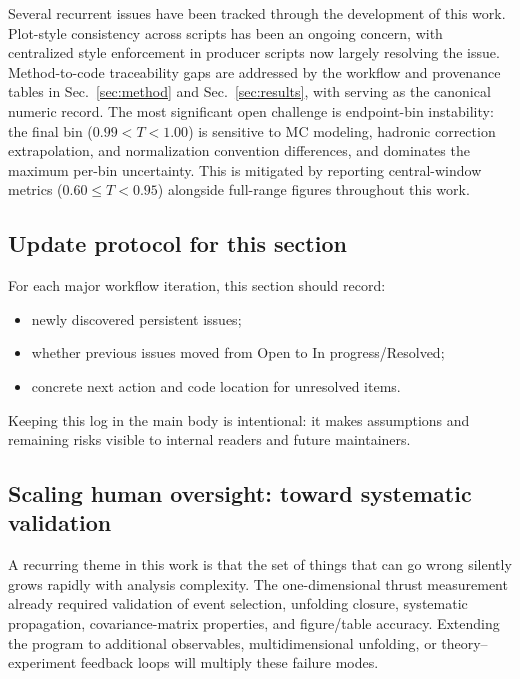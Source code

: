 Several recurrent issues have been tracked through the development of this work. Plot-style consistency across scripts has been an ongoing concern, with centralized style enforcement in producer scripts now largely resolving the issue. Method-to-code traceability gaps are addressed by the workflow and provenance tables in Sec.~\ref{sec:method} and Sec.~\ref{sec:results}, with  serving as the canonical numeric record. The most significant open challenge is endpoint-bin instability: the final bin ($0.99<T<1.00$) is sensitive to MC modeling, hadronic correction extrapolation, and normalization convention differences, and dominates the maximum per-bin uncertainty. This is mitigated by reporting central-window metrics ($0.60\le T<0.95$) alongside full-range figures throughout this work.

\subsection{Update protocol for this section}

For each major workflow iteration, this section should record:
\begin{itemize}
\item newly discovered persistent issues;
\item whether previous issues moved from Open to In progress/Resolved;
\item concrete next action and code location for unresolved items.
\end{itemize}

Keeping this log in the main body is intentional: it makes assumptions and remaining risks visible to internal readers and future maintainers.

\subsection{Scaling human oversight: toward systematic validation}
\label{sec:scaling_oversight}

A recurring theme in this work is that the set of things that can go wrong silently grows rapidly with analysis complexity. The one-dimensional thrust measurement already required validation of event selection, unfolding closure, systematic propagation, covariance-matrix properties, and figure/table accuracy. Extending the program to additional observables, multidimensional unfolding, or theory--experiment feedback loops will multiply these failure modes.

